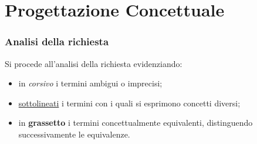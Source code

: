 \documentclass[11pt, openany]{article}
\theoremstyle{definition}
\theoremstyle{plain}
\theoremstyle{remark}
\begin{document}
	\part{Progettazione Concettuale}
		\section{Analisi della richiesta}
			Si procede all’analisi della richiesta evidenziando:
			\begin{itemize}
				\item in \textit{corsivo} i termini ambigui o imprecisi;
				\item \underline{sottolineati} i termini con i quali si esprimono concetti diversi;
				\item in \textbf{grassetto} i termini concettualmente equivalenti, distinguendo successivamente le equivalenze.
			\end{itemize}
			
\end{document}
